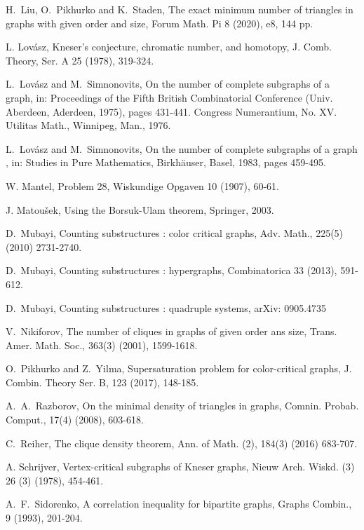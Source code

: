 \documentclass[10pt]{article}
\begin{document}
\begin{thebibliography}{1}
 H.~Liu, O.~Pikhurko and K.~Staden, The exact minimum number of triangles in graphs with given order and size, Forum Math. Pi 8 (2020), e8, 144 pp.

 L. Lov\'asz, Kneser's conjecture, chromatic number, and homotopy, J. Comb. Theory, Ser. A 25 (1978), 319-324.

 L.~Lov\'asz and M.~Simnonovits, On the number of complete subgraphs of a graph, in: Proceedings of the Fifth British Combinatorial Conference (Univ. Aberdeen, Aderdeen, 1975), pages 431-441. Congress Numerantium, No. XV. Utilitas Math., Winnipeg, Man., 1976.

 L.~Lov\'asz and M.~Simnonovits, On the number of complete subgraphs of a graph \uppercase\expandafter{}, in: Studies in Pure Mathematics, Birkh\"{a}user, Basel, 1983, pages 459-495.

 W. Mantel, Problem 28, Wiskundige Opgaven 10 (1907), 60-61.

 J. Matou\v{s}ek, Using the Borsuk-Ulam theorem, Springer, 2003.

 D.~Mubayi, Counting substructures \uppercase\expandafter{}: color critical graphs, Adv. Math., 225(5) (2010) 2731-2740.

 D.~Mubayi, Counting substructures \uppercase\expandafter{}: hypergraphs, Combinatorica 33
(2013), 591-612.

 D.~Mubayi, Counting substructures \uppercase\expandafter{}: quadruple systems, arXiv: 0905.4735


 V.~Nikiforov, The number of cliques in graphs of given order ans size, Trans. Amer. Math. Soc., 363(3) (2001), 1599-1618.

 O.~Pikhurko and Z.~Yilma, Supersaturation problem for color-critical graphs, J. Combin. Theory Ser. B, 123 (2017), 148-185.

 A.~A.~Razborov, On the minimal density of triangles in graphs, Comnin. Probab. Comput., 17(4) (2008), 603-618.

 C.~Reiher, The clique density theorem, Ann. of Math. (2), 184(3) (2016) 683-707.

 A. Schrijver, Vertex-critical subgraphs of Kneser graphs, Nieuw Arch. Wiskd. (3) 26 (3) (1978), 454-461.

 A.~F.~Sidorenko, A correlation inequality for bipartite graphs, Graphs Combin., 9 (1993), 201-204.



\end{thebibliography}
\end{document}
